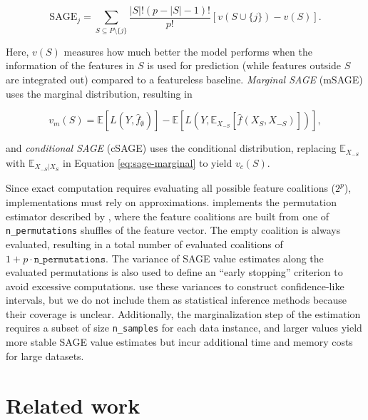 \begin{equation}
\text{SAGE}_j = \sum_{S \subseteq P \setminus \{j\}} \frac{|S|!(p-|S|-1)!}{p!} \left[ v(S \cup \{j\}) - v(S) \right].
\label{eq:sage}
\end{equation}

Here, \(v(S)\) measures how much better the model performs when the information of the features in \(S\) is used for prediction (while features outside \(S\) are integrated out) compared to a featureless baseline.
\emph{Marginal SAGE} (mSAGE) uses the marginal distribution, resulting in

\begin{equation}
v_m(S) = \mathbb{E}\left[L(Y, \hat{f}_\emptyset)\right] - \mathbb{E}\left[L\left(Y, \mathbb{E}_{X_{-S}}\left[\hat{f}(X_S, X_{-S})\right]\right)\right],
\label{eq:sage-marginal}
\end{equation}

and \emph{conditional SAGE} (cSAGE) uses the conditional distribution, replacing \(\mathbb{E}_{X_{-S}}\) with \(\mathbb{E}_{X_{-S}|X_S}\) in Equation \eqref{eq:sage-marginal} to yield \(v_c(S)\).

Since exact computation requires evaluating all possible feature coalitions (\(2^p\)), implementations must rely on approximations.
 implements the permutation estimator described by \citet{covert2020understandingglobalb}, where the feature coalitions are built from one of \texttt{n\_permutations} shuffles of the feature vector.
The empty coalition is always evaluated, resulting in a total number of evaluated coalitions of \(1 + p \cdot \mathtt{n\_permutations}\).
The variance of SAGE value estimates along the evaluated permutations is also used to define an ``early stopping'' criterion to avoid excessive computations.
\citet{covert2020understandingglobalb} use these variances to construct confidence-like intervals, but we do not include them as statistical inference methods because their coverage is unclear.
Additionally, the marginalization step of the estimation requires a subset of size \texttt{n\_samples} for each data instance, and larger values yield more stable SAGE value estimates but incur additional time and memory costs for large datasets.

\section{Related work}\label{sec-related}

